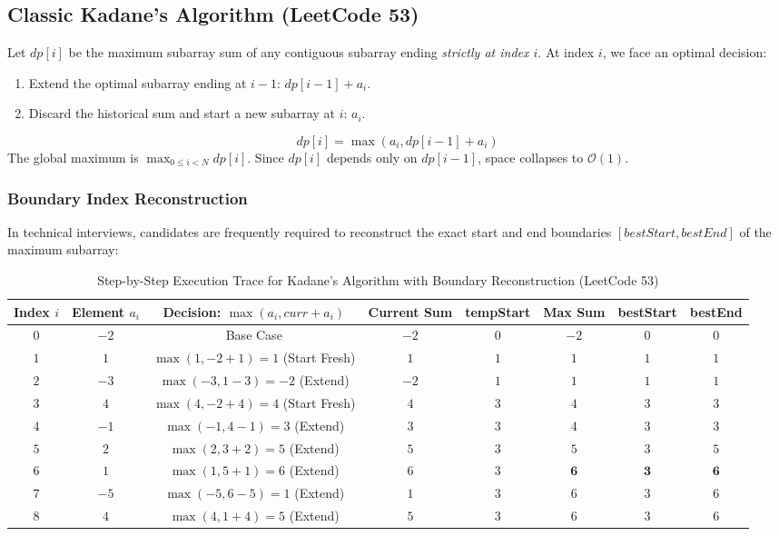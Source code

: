 \documentclass[10pt,journal,compsoc,onecolumn]{IEEEtran}
\begin{document}
\subsection{Classic Kadane's Algorithm (LeetCode 53)}
Let $dp[i]$ be the maximum subarray sum of any contiguous subarray ending \emph{strictly at index $i$}. At index $i$, we face an optimal decision:
\begin{enumerate}
    \item Extend the optimal subarray ending at $i-1$: $dp[i-1] + a_i$.
    \item Discard the historical sum and start a new subarray at $i$: $a_i$.
\end{enumerate}
\begin{equation}
dp[i] = \max(a_i, dp[i-1] + a_i)
\end{equation}
The global maximum is $\max_{0 \le i < N} dp[i]$. Since $dp[i]$ depends only on $dp[i-1]$, space collapses to $\mathcal{O}(1)$.

\subsubsection{Boundary Index Reconstruction}
In technical interviews, candidates are frequently required to reconstruct the exact start and end boundaries $[bestStart, bestEnd]$ of the maximum subarray:

\begin{table}[htbp]
\caption{Step-by-Step Execution Trace for Kadane's Algorithm with Boundary Reconstruction (LeetCode 53)}
\label{tab:trace_lc53}
\centering
\begin{tabular}{cccccccc}
\toprule
\textbf{Index $i$} & \textbf{Element $a_i$} & \textbf{Decision: $\max(a_i, curr + a_i)$} & \textbf{Current Sum} & \textbf{tempStart} & \textbf{Max Sum} & \textbf{bestStart} & \textbf{bestEnd} \\
\midrule
$0$ & $-2$ & Base Case & $-2$ & $0$ & $-2$ & $0$ & $0$ \\
$1$ & $1$ & $\max(1, -2 + 1) = 1$ (Start Fresh) & $1$ & $1$ & $1$ & $1$ & $1$ \\
$2$ & $-3$ & $\max(-3, 1 - 3) = -2$ (Extend) & $-2$ & $1$ & $1$ & $1$ & $1$ \\
$3$ & $4$ & $\max(4, -2 + 4) = 4$ (Start Fresh) & $4$ & $3$ & $4$ & $3$ & $3$ \\
$4$ & $-1$ & $\max(-1, 4 - 1) = 3$ (Extend) & $3$ & $3$ & $4$ & $3$ & $3$ \\
$5$ & $2$ & $\max(2, 3 + 2) = 5$ (Extend) & $5$ & $3$ & $5$ & $3$ & $5$ \\
$6$ & $1$ & $\max(1, 5 + 1) = 6$ (Extend) & $6$ & $3$ & $\mathbf{6}$ & $\mathbf{3}$ & $\mathbf{6}$ \\
$7$ & $-5$ & $\max(-5, 6 - 5) = 1$ (Extend) & $1$ & $3$ & $6$ & $3$ & $6$ \\
$8$ & $4$ & $\max(4, 1 + 4) = 5$ (Extend) & $5$ & $3$ & $6$ & $3$ & $6$ \\
\bottomrule
\end{tabular}
\end{table}
\end{document}

